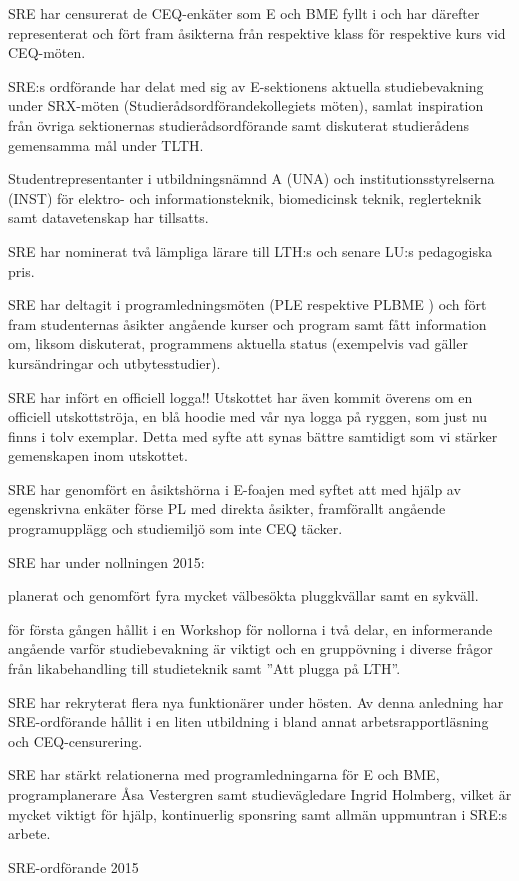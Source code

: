 \documentclass[../_main/handlingar.tex]{subfiles}
\begin{document}

SRE har censurerat de CEQ-enkäter som E och BME fyllt i och har därefter representerat och fört fram åsikterna från respektive klass för respektive kurs vid CEQ-möten.

SRE:s ordförande har delat med sig av E-sektionens aktuella studiebevakning under SRX-möten (Studierådsordförandekollegiets möten), samlat inspiration från övriga sektionernas studierådsordförande samt diskuterat studierådens gemensamma mål under TLTH.

Studentrepresentanter i utbildningsnämnd A (UNA) och institutionsstyrelserna (INST) för elektro- och informationsteknik, biomedicinsk teknik, reglerteknik samt datavetenskap har tillsatts.

SRE har nominerat två lämpliga lärare till LTH:s och senare LU:s pedagogiska pris.

SRE har deltagit i programledningsmöten (PLE respektive PLBME ) och fört fram studenternas åsikter angående kurser och program samt fått information om, liksom diskuterat, programmens aktuella status (exempelvis vad gäller kursändringar och utbytesstudier).

SRE har infört en officiell logga!! Utskottet har även kommit överens om en officiell utskottströja, en blå hoodie med vår nya logga på ryggen, som just nu finns i tolv exemplar. Detta med syfte att synas bättre samtidigt som vi stärker gemenskapen inom utskottet.

SRE har genomfört en åsiktshörna i E-foajen med syftet att med hjälp av egenskrivna enkäter förse PL med direkta åsikter, framförallt angående programupplägg och studiemiljö som inte CEQ täcker.

SRE har under nollningen 2015:
\begin{dashlist}
\item planerat och genomfört fyra mycket välbesökta pluggkvällar samt en sykväll.
\item för första gången hållit i en Workshop för nollorna i två delar, en informerande angående varför studiebevakning är viktigt och en gruppövning i diverse frågor från likabehandling till studieteknik samt ”Att plugga på LTH”.
\end{dashlist}

SRE har rekryterat flera nya funktionärer under hösten. Av denna anledning har SRE-ordförande hållit i en liten utbildning i bland annat arbetsrapportläsning och CEQ-censurering.

SRE har stärkt relationerna med programledningarna för E och BME, programplanerare Åsa Vestergren samt studievägledare Ingrid Holmberg, vilket är mycket viktigt för hjälp, kontinuerlig sponsring samt allmän uppmuntran i SRE:s arbete.

\begin{signatures}{1}
    \mvh
    \signature{Sofia Karlén}{SRE-ordförande 2015}
\end{signatures}
\end{document}
